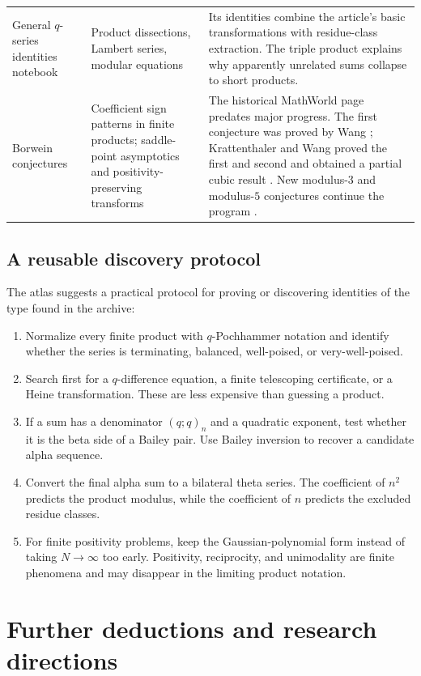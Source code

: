 \documentclass[11pt]{article}
\theoremstyle{blueplain}
\theoremstyle{bluedef}
\begin{document}
\begin{longtable}{@{}p{}p{}p{}@{}}
General $q$-series identities notebook
& Product dissections, Lambert series, modular equations
& Its identities combine the article's basic transformations with residue-class extraction.  The triple product explains why apparently unrelated sums collapse to short products.\\[0.4em]
Borwein conjectures
& Coefficient sign patterns in finite products; saddle-point asymptotics and positivity-preserving transforms
& The historical MathWorld page predates major progress.  The first conjecture was proved by Wang \cite{Wang2022}; Krattenthaler and Wang proved the first and second and obtained a partial cubic result \cite{KrattenthalerWang2022}.  New modulus-$3$ and modulus-$5$ conjectures continue the program \cite{BerkovichDhar2025}.\\
\bottomrule
\end{longtable}

\subsection{A reusable discovery protocol}

The atlas suggests a practical protocol for proving or discovering identities of the type found in the archive:
\begin{enumerate}[label=\textbf{Step \arabic*.}]
\item Normalize every finite product with $q$-Pochhammer notation and identify whether the series is terminating, balanced, well-poised, or very-well-poised.
\item Search first for a $q$-difference equation, a finite telescoping certificate, or a Heine transformation.  These are less expensive than guessing a product.
\item If a sum has a denominator $(q;q)_n$ and a quadratic exponent, test whether it is the beta side of a Bailey pair.  Use Bailey inversion to recover a candidate alpha sequence.
\item Convert the final alpha sum to a bilateral theta series.  The coefficient of $n^2$ predicts the product modulus, while the coefficient of $n$ predicts the excluded residue classes.
\item For finite positivity problems, keep the Gaussian-polynomial form instead of taking $N\to\infty$ too early.  Positivity, reciprocity, and unimodality are finite phenomena and may disappear in the limiting product notation.
\end{enumerate}

\section{Further deductions and research directions}
\end{document}
